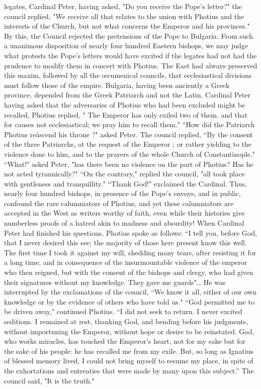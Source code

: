legates, Cardinal Peter, having asked, "Do you receive the Pope's letter?" the council replied, "We receive all that relates to the union with Photius and the interests of the Church, but not what concerns the Emperor and his provinces." By this, the Council rejected the pretensions of the Pope to Bulgaria. From such a unanimous disposition of nearly four hundred Eastern bishops, we may judge what protests the Pope's letters would have excited if the legates had not had the prudence to modify them in concert with Photius. The East had always preserved this maxim, followed by all the œcumenical councils, that ecclesiastical divisions must follow those of the empire. Bulgaria, having been anciently a Greek province, depended from the Greek Patriarch and not the Latin. Cardinal Peter having asked that the adversaries of Photius who had been excluded might be recalled, Photius replied, " The Emperor has only exiled two of them, and that for causes not ecclesiastical; we pray him to recall them." “How did the Patriarch Photius reäscend his throne ?" asked Peter. The council replied, “By the consent of the three Patriarchs, at the request of the Emperor ; or rather yielding to the violence done to him, and to the prayers of the whole Church of Constantinople." “What!" asked Peter, "has there been no violence on the part of Photius? Has he not acted tyrannically?" “On the contrary," replied the council, "all took place with gentleness and tranquillity." “Thank God!" exclaimed the Cardinal. Thus, nearly four hundred bishops, in presence of the Pope's envoys, and in public, confound the rare calumniators of Photius, and yet these calumniators are accepted in the West as writers worthy of faith, even while their histories give numberless proofs of a hatred akin to madness and absurdity! When Cardinal Peter had finished his questions, Photius spoke as follows: “I tell you, before God, that I never desired this see; the majority of those here present know this well. The first time I took it against my will, shedding many tears, after resisting it for a long time, and in consequence of the insurmountable violence of the emperor who then reigned, but with the consent of the bishops and clergy, who had given their signatures without my knowledge. They gave me guards"… He was interrupted by the exclamations of the council, “We know it all, either of our own knowledge or by the evidence of others who have told us." “God permitted me to be driven away," continued Photius. “I did not seek to return. I never excited seditions. I remained at rest, thanking God, and bending before his judgments, without importuning the Emperor, without hope or desire to be reïnstated. God, who works miracles, has touched the Emperor's heart, not for my sake but for the sake of his people: he has recalled me from my exile. But, so long as Ignatius of blessed memory lived, I could not bring myself to resume my place, in spite of the exhortations and entreaties that were made by many upon this subject.” The council said, "It is the truth."

